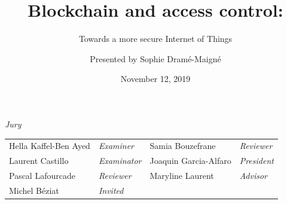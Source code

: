 \documentclass{beamer}
\author{Presented by Sophie Dram\'e-Maign\'e}
\title{Blockchain and access control:}
\subtitle{Towards a more secure Internet of Things}
\institute{Gemalto \\ T\'el\'ecom SudParis}
\date{November 12, 2019}
\begin{document}
\begin{frame}[plain]
\maketitle
\small
{\centering\itshape Jury\par}
\vskip 2mm
\begin{tabular}{l l l l}
Hella Kaffel-Ben Ayed & \emph{Examiner} & Samia Bouzefrane & \emph{Reviewer}\\
Laurent Castillo & \emph{Examinator} & Joaquin Garcia-Alfaro & \emph{President} \\
Pascal Lafourcade & \emph{Reviewer} & Maryline Laurent & \emph{Advisor}\\
Michel B\'eziat & \emph{Invited} & &\\
\end{tabular}%
\end{frame}
\end{document}
